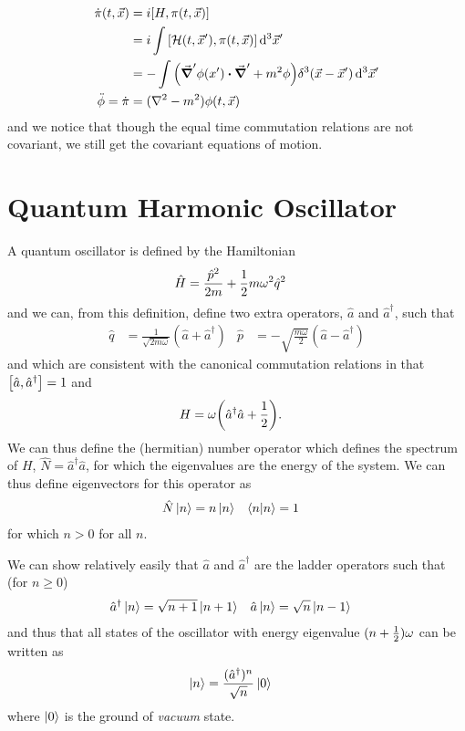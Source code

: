 \documentclass[notes.tex]{subfiles}
\begin{document}
\begin{align*}
    \dot{\pi}(t, \vec{x}) &= i\commutator{H}{\pi(t, \vec{x})}\\
    &= i \int \commutator{\mathcal{H}(t, \vec{x}^\prime)}{\pi(t, \vec{x})}\dd[3]{\vec{x}^\prime}\\
    &= - \int \qty(\grad^\prime\phi(x^\prime)\vdot\grad^\prime + m^2 \phi)\delta^3(\vec{x} - \vec{x}^\prime)  \dd[3]{\vec{x}^\prime}\\
    \ddot{\phi} = \dot{\pi} &= (\laplacian-m^2)\phi(t, \vec{x})
\end{align*}
and we notice that though the equal time commutation relations are not covariant, we still get the covariant equations of motion.

\section{Quantum Harmonic Oscillator}
A quantum oscillator is defined by the Hamiltonian
\begin{align*}
    \hat{H} &= \frac{\hat{p}^2}{2m} + \frac{1}{2}{} m \omega^2 \hat{q}^2
\end{align*}
and we can, from this definition, define two extra operators, $\hat{a}$ and $\hat{a}^\dagger$, such that
\begin{align*}
    \hat{q} &= \frac{1}{\sqrt{2m\omega}}(\hat{a} + \hat{a}^\dagger) & \hat{p} &= -\sqrt{\frac{m\omega}{2}} (\hat{a} - \hat{a}^\dagger)
\end{align*}
and which are consistent with the canonical commutation relations in that
    $\commutator{\hat{a}}{\hat{a}^\dagger} = 1$
and
\begin{align*}
    H &= \omega\qty(\hat{a}^\dagger\hat{a} + \frac{1}{2}{}).
\end{align*}
We can thus define the (hermitian) number operator which defines the spectrum of $H$, $\hat{N} = \hat{a}^\dagger\hat{a}$, for which the eigenvalues are the energy of the system.
We can thus define eigenvectors for this operator as 
\begin{align*}
    \hat{N}\ket{n} &= n\ket{n} & \braket{n}{n} &= 1
\end{align*}
for which $n>0$ for all $n$.

We can show relatively easily that $\hat{a}$ and $\hat{a}^\dagger$ are the ladder operators such that (for $n\geq 0$)
\begin{align*}
    \hat{a}^\dagger \ket{n} &= \sqrt{n+1}\ket{n+1} & \hat{a}\ket{n} &= \sqrt{n}\ket{n-1}
\end{align*}
and thus that all states of the oscillator with energy eigenvalue $(n+\frac{1}{2}{})\omega$ can be written as 
\begin{align*}
    \ket{n} &= \frac{(\hat{a}^\dagger)^n}{\sqrt{n}}\ket{0}
\end{align*}
where $\ket{0}$ is the ground of \emph{vacuum} state.
\end{document}
